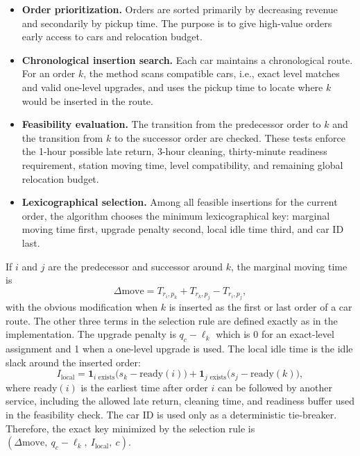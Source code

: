 \documentclass[10pt,a4paper]{article}
\begin{document}
\begin{itemize}[itemsep=2pt, parsep=0pt, topsep=4pt]
    \item \textbf{Order prioritization.} Orders are sorted primarily by
    decreasing revenue and secondarily by pickup time.  The purpose is to give
    high-value orders early access to cars and relocation budget.
    \item \textbf{Chronological insertion search.} Each car maintains a
    chronological route.  For an order $k$, the method scans compatible cars,
    i.e., exact level matches and valid one-level upgrades, and uses the pickup
    time to locate where $k$ would be inserted in the route.
    \item \textbf{Feasibility evaluation.} The transition from the predecessor
    order to $k$ and the transition from $k$ to the successor order are checked.
    These tests enforce the 1-hour possible late return, 3-hour cleaning,
    thirty-minute readiness requirement, station moving time, level
    compatibility, and remaining global relocation budget.
    \item \textbf{Lexicographical selection.} Among all feasible insertions for
    the current order, the algorithm chooses the minimum lexicographical key:
    marginal moving time first, upgrade penalty second, local idle time third,
    and car ID last.
\end{itemize}

If $i$ and $j$ are the predecessor and successor around $k$, the marginal moving
time is
\[
\Delta\text{move}=T_{r_i,p_k}+T_{r_k,p_j}-T_{r_i,p_j},
\]
with the obvious modification when $k$ is inserted as the first or last order of
a car route. The other three terms in the selection rule are defined exactly as in the implementation. The upgrade penalty is $q_c-\ell_k$
which is 0 for an exact-level assignment and 1 when a one-level upgrade is used. The local idle time is the idle slack around the inserted order:
\[
I_{\text{local}}
=\mathbf{1}_{i\text{ exists}}\big(s_k-\mathrm{ready}(i)\big)
+\mathbf{1}_{j\text{ exists}}\big(s_j-\mathrm{ready}(k)\big),
\]
where $\mathrm{ready}(i)$ is the earliest time after order $i$ can be followed
by another service, including the allowed late return, cleaning time, and
readiness buffer used in the feasibility check.  The car ID is used only as a
deterministic tie-breaker.  Therefore, the exact key minimized by the selection
rule is $(\Delta\text{move},\ q_c-\ell_k,\ I_{\text{local}},\ c)$.
\end{document}
